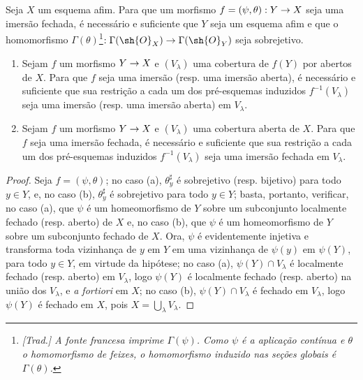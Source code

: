 \documentclass[oneside]{amsart}
\makeatletter
\newcommand{\ega@arrow}[2]{\mathchoice{#1}{#2}{#2}{#2}}
\renewcommand{\to}{\ega@arrow{\longrightarrow}{\rightarrow}}
\newcommand{\oldpage}[2][]{{\marginnote{\normalfont\textbf{#1}~|~#2}}\ignorespaces}
\let\EGAOriginalLabel\label
\renewcommand{\label}[1]{\phantomsection\EGAOriginalLabel{#1}}
\makeatother
\begin{document}
\begin{corollary}[4.2.3]
\label{I.4.2.3}
Seja $X$ um esquema afim.
Para que um morfismo $f=(\psi,\theta):Y\to X$ seja uma imersão fechada, é necessário e suficiente que $Y$ seja um esquema afim e que o homomorfismo $\Gamma(\theta)$\footnote{\emph{[Trad.] A fonte francesa imprime $\Gamma(\psi)$. Como $\psi$ é a aplicação contínua e $\theta$ o homomorfismo de feixes, o homomorfismo induzido nas seções globais é $\Gamma(\theta)$.}}$:\Gamma(\sh{O}_X)\to\Gamma(\sh{O}_Y)$ seja sobrejetivo.
\end{corollary}

\begin{corollary}[4.2.4]
\label{I.4.2.4}
\medskip\noindent
\begin{enumerate}
  \item[{\rm(a)}] Sejam $f$ um morfismo $Y\to X$ e $(V_\lambda)$ uma cobertura de $f(Y)$ por abertos de $X$.
    Para que $f$ seja uma imersão (resp. uma imersão aberta), é necessário e suficiente
\oldpage[I]{124}
    que sua restrição a cada um dos pré-esquemas induzidos $f^{-1}(V_\lambda)$ seja uma imersão (resp. uma imersão aberta) em $V_\lambda$.
  \item[{\rm(b)}] Sejam $f$ um morfismo $Y\to X$ e $(V_\lambda)$ uma cobertura aberta de $X$.
    Para que $f$ seja uma imersão fechada, é necessário e suficiente que sua restrição a cada um dos pré-esquemas induzidos $f^{-1}(V_\lambda)$ seja uma imersão fechada em $V_\lambda$.
\end{enumerate}
\end{corollary}

\begin{proof}
Seja $f=(\psi,\theta)$;
no caso (a), $\theta_y^\sharp$ é sobrejetivo (resp. bijetivo) para todo $y\in Y$, e, no caso (b), $\theta_y^\sharp$ é sobrejetivo para todo $y\in Y$;
basta, portanto, verificar, no caso (a), que $\psi$ é um homeomorfismo de $Y$ sobre um subconjunto localmente fechado (resp. aberto) de $X$ e, no caso (b), que $\psi$ é um homeomorfismo de $Y$ sobre um subconjunto fechado de $X$.
Ora, $\psi$ é evidentemente injetiva e transforma toda vizinhança de $y$ em $Y$ em uma vizinhança de $\psi(y)$ em $\psi(Y)$, para todo $y\in Y$, em virtude da hipótese;
no caso (a), $\psi(Y)\cap V_\lambda$ é localmente fechado (resp. aberto) em $V_\lambda$, logo $\psi(Y)$ é localmente fechado (resp. aberto) na união dos $V_\lambda$, e \emph{a fortiori} em $X$;
no caso (b), $\psi(Y)\cap V_\lambda$ é fechado em $V_\lambda$, logo $\psi(Y)$ é fechado em $X$, pois $X=\bigcup_\lambda V_\lambda$.
\end{proof}
\end{document}
